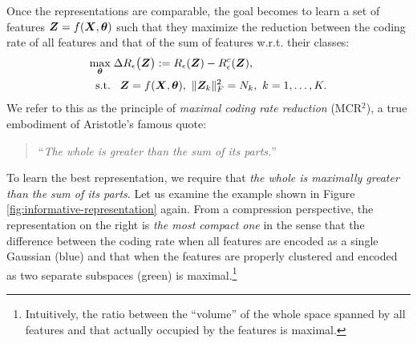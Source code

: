\documentclass[../../book-main.tex]{subfiles}
\begin{document}
Once the representations are comparable, the goal becomes to learn a set of features $\bm{Z}  = f(\bm{X}, \bm \theta)$  such that they maximize the reduction between the coding rate of all features and that of the sum of features w.r.t. their classes:
\begin{equation}
	\begin{aligned}
		\max_{\bm \theta } & \;  \Delta R_{\epsilon}\big(\Z \big) := R_{\epsilon}(\Z) - R_{\epsilon}^c(\Z ), \\
		\mbox{s.t.} & \ \ \, \Z = f(\bm X, \bm \theta),\  \|\Z_k\|_F^2                                          = N_k,\ k=1,\dots,K. 
	\end{aligned}
	\label{eqn:maximal-rate-reduction}
\end{equation}
We refer to this as the principle of {\em maximal coding rate reduction} (MCR$^2$),
a true embodiment of Aristotle's famous quote:
\begin{quote}
	\centering
	``{\em The whole is greater than the sum of its parts.}''
\end{quote}
To learn the best representation, we require that {\em the whole is maximally greater than the sum of its parts}. Let us examine the example shown in Figure \ref{fig:informative-representation} again. From a compression perspective, the representation on the right is {\em the most compact one} in the sense that the difference between the coding rate when all features are encoded as a single Gaussian (blue) and that when the features are properly clustered and encoded as two separate subspaces (green) is maximal.\footnote{Intuitively, the ratio between the ``volume'' of the whole space spanned by all features and that actually occupied by the features is maximal.}
\end{document}
